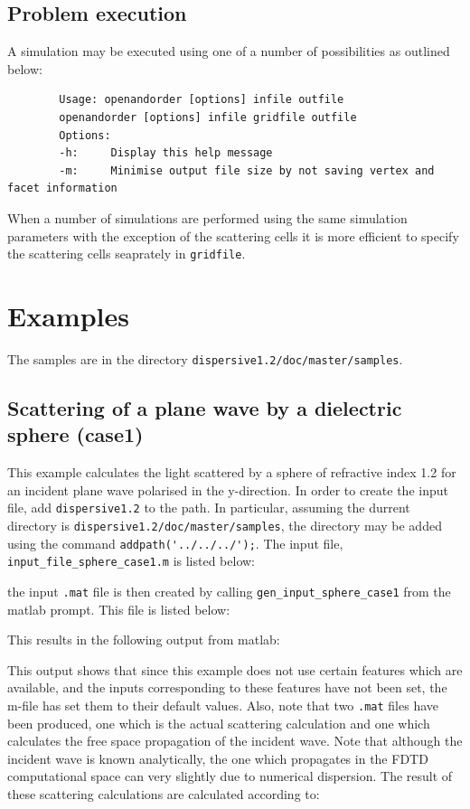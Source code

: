 \documentclass[a4paper, 12pt]{article}
\begin{document}
	\subsection{Problem execution}
	A simulation may be executed using one of a number of possibilities as
	outlined below:
	\begin{verbatim}
		Usage: openandorder [options] infile outfile
		openandorder [options] infile gridfile outfile
		Options:
		-h:     Display this help message
		-m:     Minimise output file size by not saving vertex and facet information
	\end{verbatim}
	When a number of simulations are performed using the same simulation
	parameters with the exception of the scattering cells it is more
	efficient to specify the scattering cells seaprately in \verb+gridfile+.
	\section{Examples}
	The samples are in the directory
	\verb+dispersive1.2/doc/master/samples+.
	\subsection{Scattering of a plane wave by a dielectric sphere (case1)}
	This example calculates the light scattered by a sphere of refractive
	index 1.2 for an incident plane wave polarised in the y-direction. In order to create the input file, add \verb+dispersive1.2+ to the
	path. In particular, assuming the durrent directory is
	\verb+dispersive1.2/doc/master/samples+, the directory may be added
	using the command \verb+addpath('../../../');+. The input file,
	\verb+input_file_sphere_case1.m+ is listed below:
	\small
	
	\normalsize
	the input \verb+.mat+ file is then created by calling
	\verb+gen_input_sphere_case1+ from the matlab prompt. This file is
	listed below:
	\tiny
	
	\normalsize
	This results in the following output from matlab:
	\small
	
	\normalsize
	This output shows that since this example does not use certain
	features which are available, and the inputs corresponding to these
	features have not been set, the m-file has set them to their default
	values. Also, note that two \verb+.mat+ files have been produced, one
	which is the actual scattering calculation and one which calculates
	the free space propagation of the incident wave. Note that although
	the incident wave is known analytically, the one which propagates in
	the FDTD computational space can very slightly due to numerical
	dispersion. The result of these scattering calculations are calculated
	according to:
	
\end{document}

